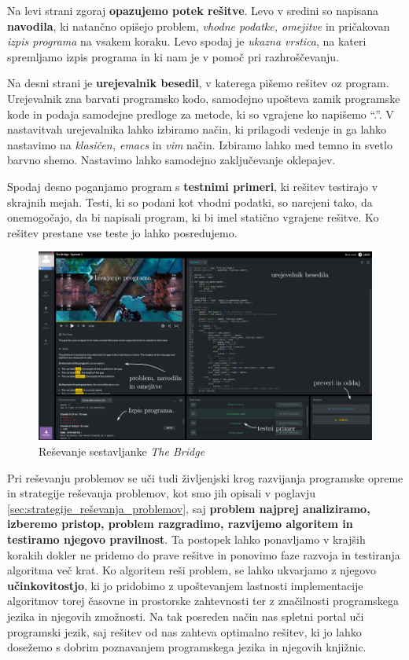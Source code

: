  Na levi strani zgoraj \textbf{opazujemo potek rešitve}. Levo v
 sredini so napisana \textbf{navodila}, ki natančno opišejo problem,
 \emph{vhodne podatke, omejitve } in pričakovan \emph{izpis programa}
 na vsakem koraku. Levo spodaj je \emph{ukazna vrstica}, na kateri
 spremljamo izpis programa in ki nam je v pomoč pri razhroščevanju.

 Na desni strani je \textbf{urejevalnik besedil}, v katerega pišemo
 rešitev oz program. Urejevalnik zna barvati programsko kodo,
 samodejno upošteva zamik programske kode in podaja samodejne predloge
 za metode, ki so vgrajene ko napišemo ``.''. V nastavitvah
 urejevalnika lahko izbiramo način, ki prilagodi vedenje in ga lahko
 nastavimo na \emph{klasičen, emacs} in \emph{vim} način. Izbiramo
 lahko med temno in svetlo barvno shemo. Nastavimo lahko samodejno
 zaključevanje oklepajev.

 Spodaj desno poganjamo program s \textbf{testnimi primeri}, ki
 rešitev testirajo v skrajnih mejah. Testi, ki so podani kot
 vhodni podatki, so narejeni tako, da onemogočajo, da bi napisali
 program, ki bi imel statično vgrajene rešitve. Ko rešitev prestane
 vse teste jo lahko posredujemo. 

\begin{figure}[h!]
  \centering
    \includegraphics [width=1\linewidth, keepaspectratio =
   1] {./images/sc_web/codingame_solving-v01.png}
   \caption{Reševanje sestavljanke \emph{The Bridge}
     \cite{web:codingame}}
   \label{fig:web:ca:solve}
 \end{figure}

 Pri reševanju problemov se uči tudi življenjski krog razvijanja
 programske opreme in strategije reševanja problemov, kot smo jih
 opisali v poglavju \ref{sec:strategije_reševanja_problemov}, saj
 \textbf{problem najprej analiziramo, izberemo pristop, problem
   razgradimo, razvijemo algoritem in testiramo njegovo
   pravilnost}. Ta postopek lahko ponavljamo v krajših korakih dokler
 ne pridemo do prave rešitve in ponovimo faze razvoja in testiranja
 algoritma več krat. Ko algoritem reši problem, se lahko ukvarjamo z
 njegovo \textbf{učinkovitostjo}, ki jo pridobimo z upoštevanjem
 lastnosti implementacije algoritmov torej časovne in prostorske
 zahtevnosti ter z značilnosti programskega jezika in njegovih
 zmožnosti. Na tak posreden način nas spletni portal uči programski
 jezik, saj rešitev od nas zahteva optimalno rešitev, ki jo lahko
 dosežemo s dobrim poznavanjem programskega jezika in njegovih
 knjižnic.

